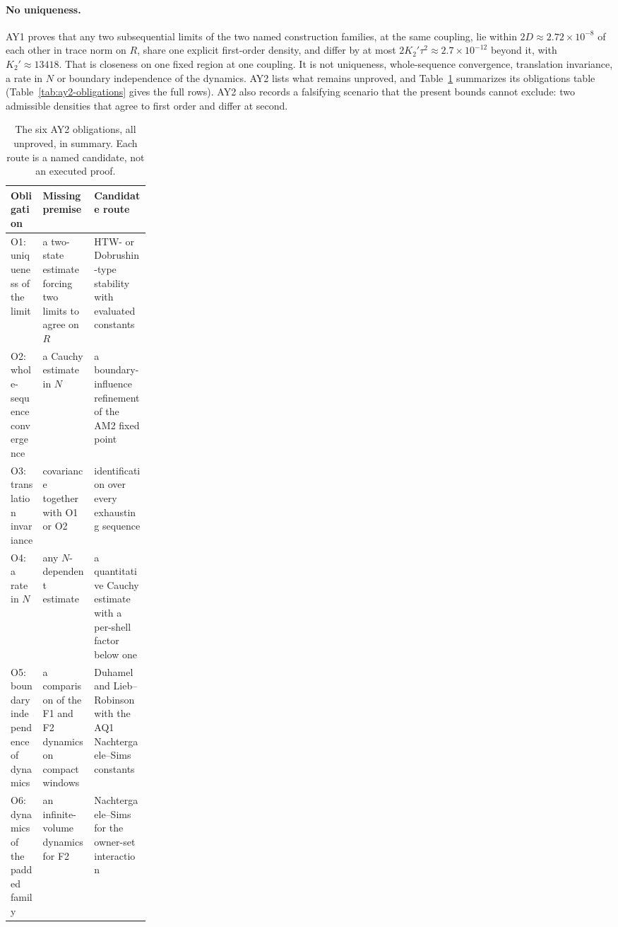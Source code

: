 \paragraph{No uniqueness.}
AY1 proves that any two subsequential limits of the two named construction
families, at the same coupling, lie within $2D\approx2.72\times10^{-8}$ of
each other in trace norm on $R$, share one explicit first-order density, and
differ by at most $2K_2'\tau^2\approx2.7\times10^{-12}$ beyond it, with
$K_2'\approx13418$. That is closeness on one fixed region at one coupling. It
is not uniqueness, whole-sequence convergence, translation invariance, a rate
in $N$ or boundary independence of the dynamics. AY2 lists what remains
unproved, and Table~\ref{tab:limits-obligations} summarizes its obligations
table (Table~\ref{tab:ay2-obligations} gives the full rows). AY2 also records
a falsifying scenario that the present bounds cannot exclude: two admissible
densities that agree to first order and differ at second.

\begin{table}[htbp]
\centering\small
\caption{The six AY2 obligations, all unproved, in summary. Each route is a
named candidate, not an executed proof.}
\label{tab:limits-obligations}
\begin{tabularx}{\linewidth}{@{}>{\raggedright\arraybackslash}p{0.23\linewidth}
 >{\raggedright\arraybackslash}X >{\raggedright\arraybackslash}X@{}}
\toprule
Obligation & Missing premise & Candidate route\\
\midrule
O1: uniqueness of the limit & a two-state estimate forcing two limits to agree
on $R$ & HTW- or Dobrushin-type stability with evaluated constants\\
O2: whole-sequence convergence & a Cauchy estimate in $N$ & a
boundary-influence refinement of the AM2 fixed point\\
O3: translation invariance & covariance together with O1 or O2 &
identification over every exhausting sequence\\
O4: a rate in $N$ & any $N$-dependent estimate & a quantitative Cauchy
estimate with a per-shell factor below one\\
O5: boundary independence of dynamics & a comparison of the F1 and F2
dynamics on compact windows & Duhamel and Lieb--Robinson with the AQ1
Nachtergaele--Sims constants\\
O6: dynamics of the padded family & an infinite-volume dynamics for F2 &
Nachtergaele--Sims for the owner-set interaction\\
\bottomrule
\end{tabularx}
\end{table}

